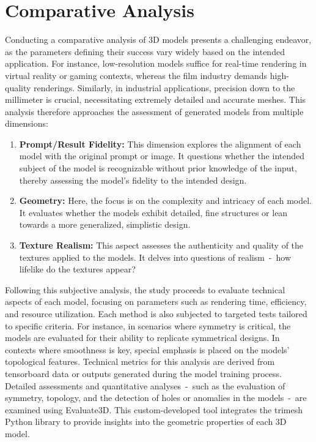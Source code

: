 \section{Comparative Analysis}\label{comparativeAnalysis}

Conducting a comparative analysis of 3D models presents a challenging endeavor, as the parameters defining their success vary widely based on the intended application. For instance, low-resolution models suffice for real-time rendering in virtual reality or gaming contexts, whereas the film industry demands high-quality renderings. Similarly, in industrial applications, precision down to the millimeter is crucial, necessitating extremely detailed and accurate meshes. This analysis therefore approaches the assessment of generated models from multiple dimensions:

\begin{enumerate}
    \item \textbf{Prompt/Result Fidelity:} This dimension explores the alignment of each model with the original prompt or image. It questions whether the intended subject of the model is recognizable without prior knowledge of the input, thereby assessing the model's fidelity to the intended design.
    \item \textbf{Geometry:} Here, the focus is on the complexity and intricacy of each model. It evaluates whether the models exhibit detailed, fine structures or lean towards a more generalized, simplistic design. 
    \item \textbf{Texture Realism:} This aspect assesses the authenticity and quality of the textures applied to the models. It delves into questions of realism~-~how lifelike do the textures appear?
\end{enumerate}

Following this subjective analysis, the study proceeds to evaluate technical aspects of each model, focusing on parameters such as rendering time, efficiency, and resource utilization. Each method is also subjected to targeted tests tailored to specific criteria. For instance, in scenarios where symmetry is critical, the models are evaluated for their ability to replicate symmetrical designs. In contexts where smoothness is key, special emphasis is placed on the models' topological features. Technical metrics for this analysis are derived from tensorboard data or outputs generated during the model training process. Detailed assessments and quantitative analyses~-~such as the evaluation of symmetry, topology, and the detection of holes or anomalies in the models~-~are examined using Evaluate3D. This custom-developed tool integrates the trimesh Python library \citep{trimesh} to provide insights into the geometric properties of each 3D model.



 
    
    
    
